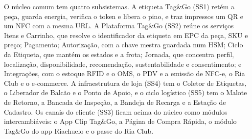 \begin{figure}[htbp]
{}
\end{figure}

O núcleo comum tem quatro subsistemas. A etiqueta Tag\&Go (SS1) retém a peça, guarda energia, verifica o token e libera o pino, e traz impressos um QR e um NFC com a mesma URL. A Plataforma Tag\&Go (SS2) reúne os serviços Itens e Carrinho, que resolve o identificador da etiqueta em EPC da peça, SKU e preço; Pagamento; Autorização, com a chave mestra guardada num HSM; Ciclo da Etiqueta, que mantém os estados e a frota; Jornada, que concentra perfil, localização, disponibilidade, recomendação, sustentabilidade e consentimento; e Integrações, com o estoque RFID e o OMS, o PDV e a emissão de NFC-e, o Ria Club e o e-commerce. A infraestrutura de loja (SS4) tem o Coletor de Etiquetas, o Liberador de Balcão e o Ponto de Apoio, e o ciclo logístico (SS5) tem o Malote de Retorno, a Bancada de Inspeção, a Bandeja de Recarga e a Estação de Cadastro. Os canais do cliente (SS3) ficam acima do núcleo como módulos intercambiáveis: o App Clip Tag\&Go, a Página de Compra Rápida, o módulo Tag\&Go do app Riachuelo e o passe do Ria Club.

